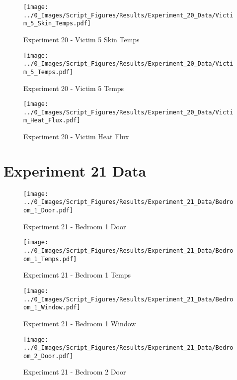 	\begin{figure}[H]
		\centering
		\texttt{[image: ../0\_Images/Script\_Figures/Results/Experiment\_20\_Data/Victim\_5\_Skin\_Temps.pdf]}
		\caption[]{Experiment 20 - Victim 5 Skin Temps}
	\end{figure}
 
	\clearpage

	\begin{figure}[H]
		\centering
		\texttt{[image: ../0\_Images/Script\_Figures/Results/Experiment\_20\_Data/Victim\_5\_Temps.pdf]}
		\caption[]{Experiment 20 - Victim 5 Temps}
	\end{figure}
 

	\begin{figure}[H]
		\centering
		\texttt{[image: ../0\_Images/Script\_Figures/Results/Experiment\_20\_Data/Victim\_Heat\_Flux.pdf]}
		\caption[]{Experiment 20 - Victim Heat Flux}
	\end{figure}
 
	\clearpage

\clearpage		\large
\section{Experiment 21 Data} \label{App:Exp21Results} 

	\begin{figure}[H]
		\centering
		\texttt{[image: ../0\_Images/Script\_Figures/Results/Experiment\_21\_Data/Bedroom\_1\_Door.pdf]}
		\caption[]{Experiment 21 - Bedroom 1 Door}
	\end{figure}
 

	\begin{figure}[H]
		\centering
		\texttt{[image: ../0\_Images/Script\_Figures/Results/Experiment\_21\_Data/Bedroom\_1\_Temps.pdf]}
		\caption[]{Experiment 21 - Bedroom 1 Temps}
	\end{figure}
 
	\clearpage

	\begin{figure}[H]
		\centering
		\texttt{[image: ../0\_Images/Script\_Figures/Results/Experiment\_21\_Data/Bedroom\_1\_Window.pdf]}
		\caption[]{Experiment 21 - Bedroom 1 Window}
	\end{figure}
 

	\begin{figure}[H]
		\centering
		\texttt{[image: ../0\_Images/Script\_Figures/Results/Experiment\_21\_Data/Bedroom\_2\_Door.pdf]}
		\caption[]{Experiment 21 - Bedroom 2 Door}
	\end{figure}
 
